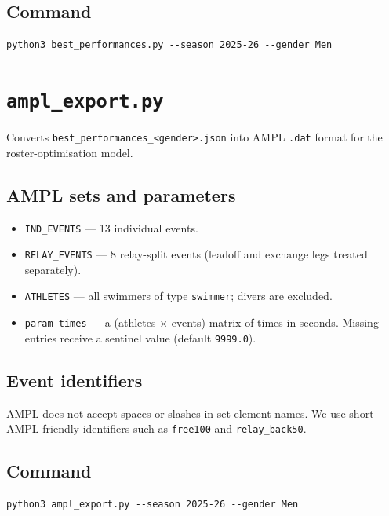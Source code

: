 \documentclass{article}
\begin{document}
\subsection*{Command}
\begin{lstlisting}
python3 best_performances.py --season 2025-26 --gender Men
\end{lstlisting}

\section{\texttt{ampl\_export.py}}

Converts \texttt{best\_performances\_<gender>.json} into AMPL \texttt{.dat}
format for the roster-optimisation model.

\subsection*{AMPL sets and parameters}

\begin{itemize}[noitemsep]
  \item \texttt{IND\_EVENTS} --- 13 individual events.
  \item \texttt{RELAY\_EVENTS} --- 8 relay-split events (leadoff and exchange
        legs treated separately).
  \item \texttt{ATHLETES} --- all swimmers of type \texttt{swimmer};
        divers are excluded.
  \item \texttt{param times} --- a (athletes $\times$ events) matrix of times
        in seconds. Missing entries receive a sentinel value (default
        \texttt{9999.0}).
\end{itemize}

\subsection*{Event identifiers}

AMPL does not accept spaces or slashes in set element names. We use short
AMPL-friendly identifiers such as \texttt{free100} and \texttt{relay\_back50}.

\subsection*{Command}
\begin{lstlisting}
python3 ampl_export.py --season 2025-26 --gender Men
\end{lstlisting}
\end{document}

